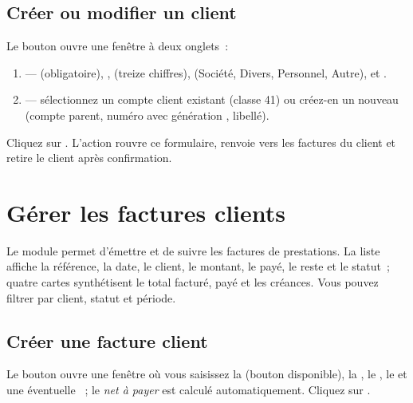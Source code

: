 \subsection{Créer ou modifier un client}

Le bouton  ouvre une fenêtre à deux onglets~:

\begin{enumerate}
  \item {} —  (obligatoire), ,  (treize chiffres),  (Société, Divers, Personnel, Autre),  et .
  \item {} — sélectionnez un compte client existant (classe 41) ou créez-en un nouveau (compte parent, numéro avec génération , libellé).
\end{enumerate}

Cliquez sur . L'action  rouvre ce formulaire,  renvoie vers les factures du client et  retire le client après confirmation.


\section{Gérer les factures clients}

Le module  permet d'émettre et de suivre les factures de prestations. La liste affiche la référence, la date, le client, le montant, le payé, le reste et le statut~; quatre cartes synthétisent le total facturé, payé et les créances. Vous pouvez filtrer par client, statut et période.

\subsection{Créer une facture client}

Le bouton  ouvre une fenêtre où vous saisissez la  (bouton  disponible), la , le , le  et une éventuelle ~; le \emph{net à payer} est calculé automatiquement. Cliquez sur .


